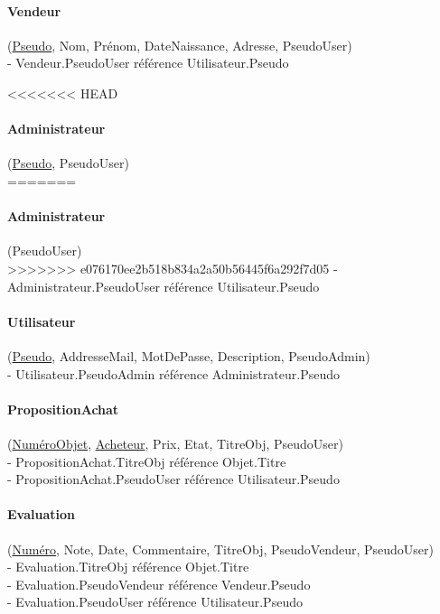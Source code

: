 \documentclass[a4paper,11pt]{article}
\begin{document}
\paragraph{Vendeur} (\underline{Pseudo}, Nom, Prénom, DateNaissance, Adresse, PseudoUser)\\
\indent - Vendeur.PseudoUser référence Utilisateur.Pseudo


<<<<<<< HEAD
\paragraph{Administrateur} (\underline{Pseudo}, PseudoUser)\\
=======
\paragraph{Administrateur} (PseudoUser)\\
>>>>>>> e076170ee2b518b834a2a50b56445f6a292f7d05
\indent - Administrateur.PseudoUser référence Utilisateur.Pseudo


\paragraph{Utilisateur} (\underline{Pseudo}, AddresseMail, MotDePasse, 
Description, PseudoAdmin)\\
\indent - Utilisateur.PseudoAdmin référence Administrateur.Pseudo


\paragraph{PropositionAchat} (\underline{NuméroObjet}, \underline{Acheteur}, Prix, Etat, TitreObj, PseudoUser)\\
\indent - PropositionAchat.TitreObj référence Objet.Titre\\
\indent - PropositionAchat.PseudoUser référence Utilisateur.Pseudo


\paragraph{Evaluation} (\underline{Numéro}, Note, Date, Commentaire, TitreObj, PseudoVendeur, PseudoUser)\\
\indent - Evaluation.TitreObj référence Objet.Titre\\
\indent - Evaluation.PseudoVendeur référence Vendeur.Pseudo\\
\indent - Evaluation.PseudoUser référence Utilisateur.Pseudo
\end{document}
